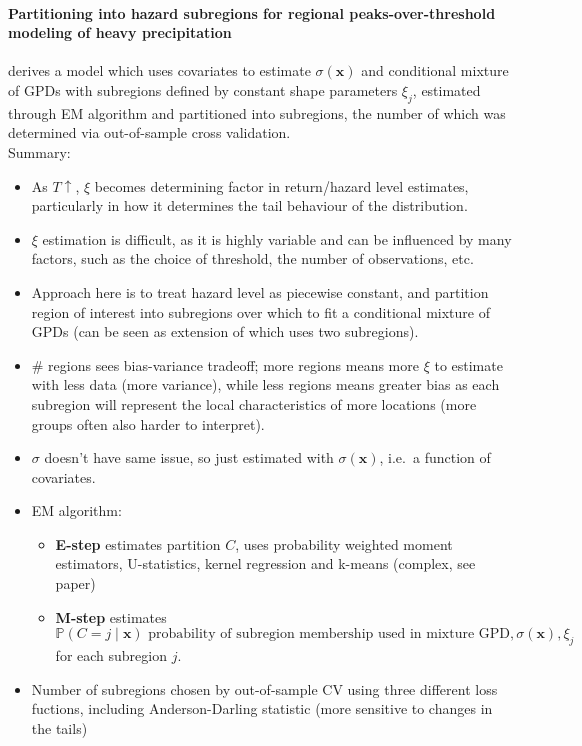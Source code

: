 \documentclass{article}
\numberwithin{equation}{section}
\begin{document}
\paragraph{Partitioning into hazard subregions for regional peaks-over-threshold modeling of heavy precipitation}


\cite{Carreau2017} derives a model which uses covariates to estimate $\sigma(\bm{x})$ and conditional mixture of GPDs with subregions defined by constant shape parameters $\xi_j$, estimated through EM algorithm and partitioned into subregions, the number of which was determined via out-of-sample cross validation. \\
Summary:
\begin{itemize}
  \item As $T \uparrow$, $\xi$ becomes determining factor in return/hazard level estimates, particularly in how it determines the tail behaviour of the distribution.
  \item $\xi$ estimation is difficult, as it is highly variable and can be influenced by many factors, such as the choice of threshold, the number of observations, etc.
  \item Approach here is to treat hazard level as piecewise constant, and partition region of interest into subregions over which to fit a conditional mixture of GPDs (can be seen as extension of \cite{Cooley2007} which uses two subregions).
  \item \# regions sees bias-variance tradeoff; more regions means more $\xi$ to estimate with less data (more variance), while less regions means greater bias as each subregion will represent the local characteristics of more locations (more groups often also harder to interpret). 
  \item $\sigma$ doesn't have same issue, so just estimated with $\sigma(\bm{x})$, i.e.\ a function of covariates. 
  \item EM algorithm: \\
  \begin{itemize}
    \item \textbf{E-step} estimates partition $C$, uses probability weighted moment estimators, U-statistics, kernel regression and k-means (complex, see paper)
    \item \textbf{M-step} estimates $\mathbb{P}(C = j \mid \bm{x}) \text{ probability of subregion membership used in mixture GPD}, \sigma(\bm{x}), \xi_j$ for each subregion $j$.
  \end{itemize}
  \item Number of subregions chosen by out-of-sample CV using three different loss fuctions, including Anderson-Darling statistic (more sensitive to changes in the tails)
\end{itemize}
\end{document}
